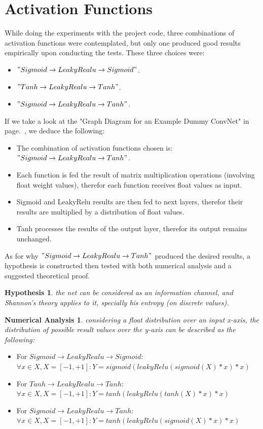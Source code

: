 \documentclass[a4paper, 12pt]{report}
\newcommand\tab[1][1cm]{\hspace*{#1}}
\newtheorem{hypothesis}{Hypothesis}
\newtheorem{numericalanalysis}{Numerical Analysis}
\begin{document}
\section{\textbf{Activation Functions}}
While doing the experiments with the project code, three combinations of activation functions were contemplated, but only one produced good results empirically upon conducting the tests. These three choices were:
\begin{itemize}[nosep]
	\item $" Sigmoid \rightarrow LeakyRealu \rightarrow Sigmoid "$.
	\item $" Tanh \rightarrow LeakyRealu \rightarrow Tanh "$.
	\item $" Sigmoid \rightarrow LeakyRealu \rightarrow Tanh "$.
\end{itemize}
If we take a look at the "Graph Diagram for an Example Dummy ConvNet" in page.~\pageref{fig:SimpleNetDiagram}, we deduce the following:
\begin{itemize}[nosep]
	\item The combination of activation functions chosen is: $" Sigmoid \rightarrow LeakyRealu \rightarrow Tanh "$.
	\item Each function is fed the result of matrix multiplication operations (involving float weight values), therefor each function receives float values as input.
	\item Sigmoid and LeakyRelu results are then fed to next layers, therefor their results are multiplied by a distribution of float values.
	\item Tanh processes the results of the output layer, therefor its output remains unchanged.
\end{itemize}
As for why $" Sigmoid \rightarrow LeakyRealu \rightarrow Tanh "$ produced the desired results, a hypothesis is constructed then tested with both numerical analysis and a suggested theoretical proof.
\begin{hypothesis}\label{hypothesis:1}
	the net can be considered as an information channel, and Shannon's theory \citep{Shannon:2001:MTC:584091.584093} applies to it, specially his entropy (on discrete values).
\end{hypothesis}
\begin{numericalanalysis}\label{analysis:1}
	considering a float distribution over an input x-axis, the distribution of possible result values over the y-axis can be described as the following:
\end{numericalanalysis}
\begin{itemize}[nosep]
	\item For $ Sigmoid \rightarrow LeakyRealu \rightarrow Sigmoid $:\\\tab $ \forall x \in X, X = [-1, +1]: Y = sigmoid(leakyRelu(sigmoid(X)*x)*x) $
	\item For $ Tanh \rightarrow LeakyRealu \rightarrow Tanh $:\\\tab $ \forall x \in X, X = [-1, +1]: Y = tanh(leakyRelu(tanh(X)*x)*x) $
	\item For $ Sigmoid \rightarrow LeakyRealu \rightarrow Tanh $:\\\tab $ \forall x \in X, X = [-1, +1]: Y = tanh(leakyRelu(sigmoid(X)*x)*x) $
\end{itemize}
\end{document}
